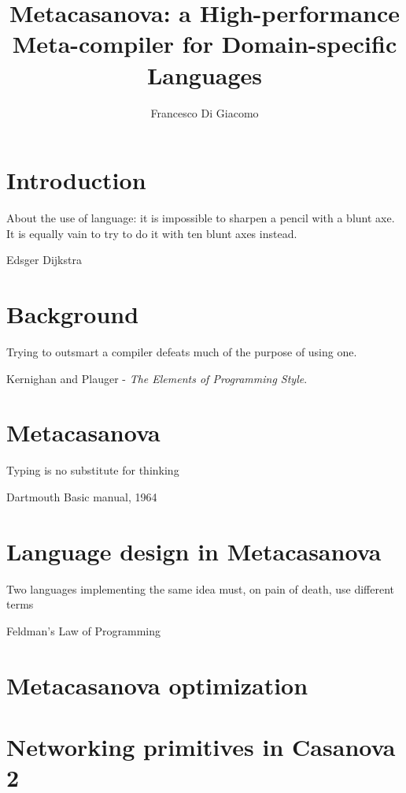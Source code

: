 \documentclass[8pt,a5paper]{extbook}
\author{Francesco Di Giacomo}
\title{Metacasanova: a High-performance Meta-compiler for Domain-specific Languages}
\date { }
\theoremstyle{definition}
\begin{document}

\newpage
\frontmatter
\maketitle

\tableofcontents

\mainmatter

\chapter{Introduction}
\label{ch:introduction}
\epigraph{About the use of language: it is impossible to sharpen a pencil with a blunt axe. It is equally vain to try to do it with ten blunt axes instead.}{Edsger Dijkstra}

	

\chapter{Background}
\label{ch:background}
\epigraph{Trying to outsmart a compiler defeats much of the purpose of using one.}{Kernighan and Plauger - \textit{The Elements of Programming Style}.}

	
\chapter{Metacasanova}
\label{ch:metacasanova}
\epigraph{Typing is no substitute for thinking}{Dartmouth Basic manual, 1964}
		

\chapter{Language design in Metacasanova}
\label{ch:languages}
\epigraph{Two languages implementing the same idea must, on pain of death, use different terms}{Feldman's Law of Programming}


\chapter{Metacasanova optimization}
\label{ch:functors}

	
\chapter{Networking primitives in Casanova 2}
\label{ch:networking}

\end{document}
